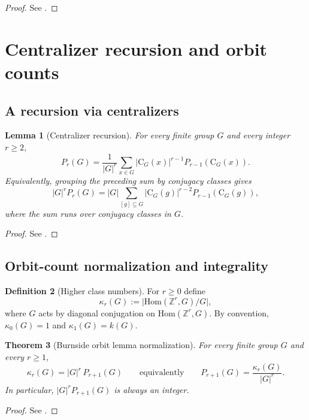 \documentclass[11pt]{article}
\newtheorem{theorem}{Theorem}[section]
\newtheorem{lemma}[theorem]{Lemma}
\theoremstyle{definition}
\newtheorem{definition}[theorem]{Definition}
\theoremstyle{remark}
\theoremstyle{definition}
\theoremstyle{plain}
\newcommand{\Hom}{\mathrm{Hom}}
\newcommand{\C}{\mathrm{C}}
\begin{document}
\begin{proof}
See \cite[\S2.1]{LevitShwartzPartI}.
\end{proof}

\section{Centralizer recursion and orbit counts}

\subsection{A recursion via centralizers}

\begin{lemma}[Centralizer recursion]\label{lem:recursion}
For every finite group $G$ and every integer $r\ge 2$,
\[
P_r(G)=\frac{1}{|G|^r}\sum_{x\in G}|\C_G(x)|^{r-1}P_{r-1}(\C_G(x)).
\]
Equivalently, grouping the preceding sum by conjugacy classes gives
\[
|G|^rP_r(G)=|G|\sum_{[g]\subseteq G}|\C_G(g)|^{r-2}P_{r-1}(\C_G(g)),
\]
where the sum runs over conjugacy classes in $G$.
\end{lemma}

\begin{proof}
See \cite[Lemma~3.1]{LevitShwartzPartI}.
\end{proof}

\subsection{Orbit-count normalization and integrality}

\begin{definition}[Higher class numbers]\label{def:kappa}
For $r\ge 0$ define
\[
\kappa_r(G):=\big|\Hom(\mathbb Z^r,G)/G\big|,
\]
where $G$ acts by diagonal conjugation on $\Hom(\mathbb Z^r,G)$.
By convention, $\kappa_0(G)=1$ and $\kappa_1(G)=k(G)$.
\end{definition}

\begin{theorem}[Burnside orbit lemma normalization]\label{thm:burnside}
For every finite group $G$ and every $r\ge 1$,
\[
\kappa_r(G)=|G|^r\,P_{r+1}(G)
\qquad\text{equivalently}\qquad
P_{r+1}(G)=\frac{\kappa_r(G)}{|G|^r}.
\]
In particular, $|G|^rP_{r+1}(G)$ is always an integer.
\end{theorem}

\begin{proof}
See \cite[Theorem~3.4]{LevitShwartzPartI}.
\end{proof}
\end{document}
